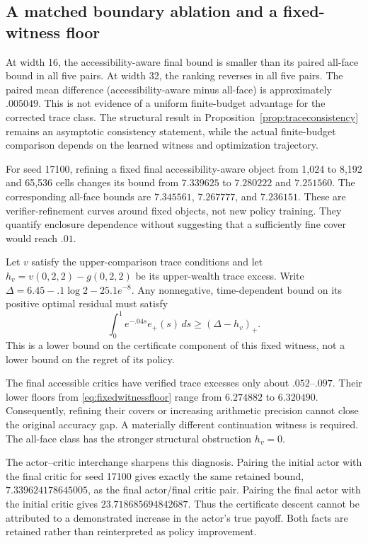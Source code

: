 \subsection{A matched boundary ablation and a fixed-witness floor}
At width 16, the accessibility-aware final bound is smaller than its paired all-face bound in all five pairs. At width 32, the ranking reverses in all five pairs. The paired mean difference (accessibility-aware minus all-face) is approximately $.005049$. This is not evidence of a uniform finite-budget advantage for the corrected trace class. The structural result in Proposition~\ref{prop:traceconsistency} remains an asymptotic consistency statement, while the actual finite-budget comparison depends on the learned witness and optimization trajectory.

For seed 17100, refining a fixed final accessibility-aware object from 1,024 to 8,192 and 65,536 cells changes its bound from $7.339625$ to $7.280222$ and $7.251560$. The corresponding all-face bounds are $7.345561$, $7.267777$, and $7.236151$. These are verifier-refinement curves around fixed objects, not new policy training. They quantify enclosure dependence without suggesting that a sufficiently fine cover would reach $.01$.

\begin{proposition}\label{prop:fixedwitness}
Let $v$ satisfy the upper-comparison trace conditions and let
$h_v=v(0,2,2)-g(0,2,2)$ be its upper-wealth trace excess. Write
$\Delta=6.45-.1\log2-25.1e^{-8}$. Any nonnegative, time-dependent bound on its positive optimal residual must satisfy
\begin{equation}
 \int_0^1 e^{-.04s}e_+(s)\,ds\geq(\Delta-h_v)_+ .\label{eq:fixedwitnessfloor}
\end{equation}
This is a lower bound on the certificate component of this fixed witness, not a lower bound on the regret of its policy.
\end{proposition}
The final accessible critics have verified trace excesses only about $.052$--$.097$. Their lower floors from \eqref{eq:fixedwitnessfloor} range from $6.274882$ to $6.320490$. Consequently, refining their covers or increasing arithmetic precision cannot close the original accuracy gap. A materially different continuation witness is required. The all-face class has the stronger structural obstruction $h_v=0$.

The actor--critic interchange sharpens this diagnosis. Pairing the initial actor with the final critic for seed 17100 gives exactly the same retained bound, $7.339624178645005$, as the final actor/final critic pair. Pairing the final actor with the initial critic gives $23.718685694842687$. Thus the certificate descent cannot be attributed to a demonstrated increase in the actor's true payoff. Both facts are retained rather than reinterpreted as policy improvement.

